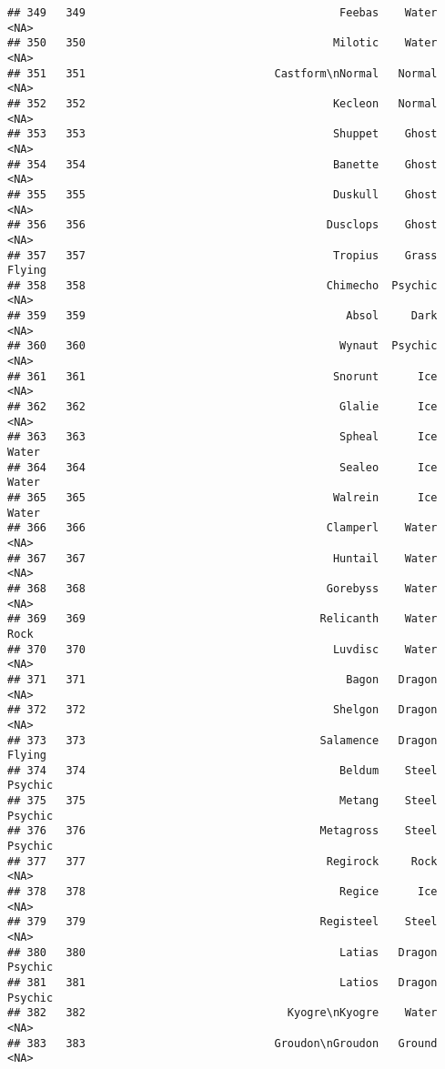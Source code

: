 \documentclass[
]{article}
\begin{document}
\begin{verbatim}
## 349   349                                       Feebas    Water     <NA>
## 350   350                                      Milotic    Water     <NA>
## 351   351                             Castform\nNormal   Normal     <NA>
## 352   352                                      Kecleon   Normal     <NA>
## 353   353                                      Shuppet    Ghost     <NA>
## 354   354                                      Banette    Ghost     <NA>
## 355   355                                      Duskull    Ghost     <NA>
## 356   356                                     Dusclops    Ghost     <NA>
## 357   357                                      Tropius    Grass   Flying
## 358   358                                     Chimecho  Psychic     <NA>
## 359   359                                        Absol     Dark     <NA>
## 360   360                                       Wynaut  Psychic     <NA>
## 361   361                                      Snorunt      Ice     <NA>
## 362   362                                       Glalie      Ice     <NA>
## 363   363                                       Spheal      Ice    Water
## 364   364                                       Sealeo      Ice    Water
## 365   365                                      Walrein      Ice    Water
## 366   366                                     Clamperl    Water     <NA>
## 367   367                                      Huntail    Water     <NA>
## 368   368                                     Gorebyss    Water     <NA>
## 369   369                                    Relicanth    Water     Rock
## 370   370                                      Luvdisc    Water     <NA>
## 371   371                                        Bagon   Dragon     <NA>
## 372   372                                      Shelgon   Dragon     <NA>
## 373   373                                    Salamence   Dragon   Flying
## 374   374                                       Beldum    Steel  Psychic
## 375   375                                       Metang    Steel  Psychic
## 376   376                                    Metagross    Steel  Psychic
## 377   377                                     Regirock     Rock     <NA>
## 378   378                                       Regice      Ice     <NA>
## 379   379                                    Registeel    Steel     <NA>
## 380   380                                       Latias   Dragon  Psychic
## 381   381                                       Latios   Dragon  Psychic
## 382   382                               Kyogre\nKyogre    Water     <NA>
## 383   383                             Groudon\nGroudon   Ground     <NA>

\end{verbatim}
\end{document}
